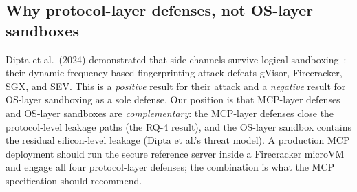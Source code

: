 \subsection{Why protocol-layer defenses, not OS-layer sandboxes}

Dipta et al.~(2024) demonstrated that side channels survive
logical sandboxing~\cite{dipta_2024_sandbox}: their dynamic
frequency-based fingerprinting attack defeats gVisor,
Firecracker, SGX, and SEV. This is a \emph{positive} result for
their attack and a \emph{negative} result for OS-layer
sandboxing as a sole defense. Our position is that MCP-layer
defenses and OS-layer sandboxes are \emph{complementary}: the
MCP-layer defenses close the protocol-level leakage paths (the
RQ-4 result), and the OS-layer sandbox contains the residual
silicon-level leakage (Dipta et al.'s threat model). A
production MCP deployment should run the secure reference
server inside a Firecracker microVM and engage all four
protocol-layer defenses; the combination is what the MCP
specification should recommend.